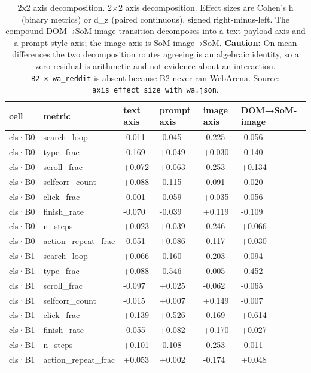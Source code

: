 \begin{table}[tp]
\centering
\caption{2x2 axis decomposition. 2×2 axis decomposition. Effect sizes are Cohen's h (binary metrics) or d\_z (paired continuous), signed right-minus-left. The compound DOM→SoM-image transition decomposes into a text-payload axis and a prompt-style axis; the image axis is SoM-image→SoM. \textbf{Caution:} On mean differences the two decomposition routes agreeing is an algebraic identity, so a zero residual is arithmetic and not evidence about an interaction. \texttt{B2\ ×\ wa\_reddit} is absent because B2 never ran WebArena. Source: \texttt{axis\_effect\_size\_with\_wa.json}.}
\label{tab:t30}
\scriptsize
\setlength{\tabcolsep}{3pt}
\begin{tabular}{@{}llllll@{}}
\toprule
cell & metric & text axis & prompt axis & image axis & DOM→SoM-image \\
\midrule
cls·B0 & search\_loop & -0.011 & -0.045 & -0.225 & -0.056 \\
cls·B0 & type\_frac & -0.169 & +0.049 & +0.030 & -0.140 \\
cls·B0 & scroll\_frac & +0.072 & +0.063 & -0.253 & +0.134 \\
cls·B0 & selfcorr\_count & +0.088 & -0.115 & -0.091 & -0.020 \\
cls·B0 & click\_frac & -0.001 & -0.059 & +0.035 & -0.056 \\
cls·B0 & finish\_rate & -0.070 & -0.039 & +0.119 & -0.109 \\
cls·B0 & n\_steps & +0.023 & +0.039 & -0.246 & +0.066 \\
cls·B0 & action\_repeat\_frac & -0.051 & +0.086 & -0.117 & +0.030 \\
cls·B1 & search\_loop & +0.066 & -0.160 & -0.203 & -0.094 \\
cls·B1 & type\_frac & +0.088 & -0.546 & -0.005 & -0.452 \\
cls·B1 & scroll\_frac & -0.097 & +0.025 & -0.062 & -0.065 \\
cls·B1 & selfcorr\_count & -0.015 & +0.007 & +0.149 & -0.007 \\
cls·B1 & click\_frac & +0.139 & +0.526 & -0.169 & +0.614 \\
cls·B1 & finish\_rate & -0.055 & +0.082 & +0.170 & +0.027 \\
cls·B1 & n\_steps & +0.101 & -0.108 & -0.253 & -0.011 \\
cls·B1 & action\_repeat\_frac & +0.053 & +0.002 & -0.174 & +0.048 \\

\end{tabular}
\end{table}
